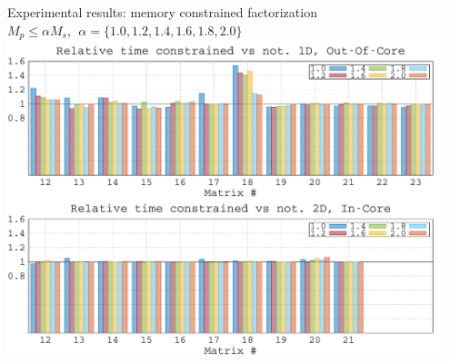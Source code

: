 \begin{frame}{Experimental results: memory constrained factorization}
  \centering
  \alert{$M_p \le \alpha M_s,~~\alpha=\{1.0,1.2,1.4,1.6,1.8,2.0\}$}
  \includegraphics[width=0.95\textwidth]{data/ma_times2}
\end{frame}


   





